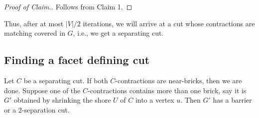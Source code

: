 \documentclass[11pt]{article}
\newcommand{\1}{\mathbf{1}}
\newcommand{\0}{\mathbf{0}}
\newcommand{\zS}{\mathcal S}
\newenvironment{cproof}
{\begin{proof}
 [Proof of Claim.]
 \vspace{-1.2\parsep}}
{\renewcommand{\qed}{\hfill $\Diamond$} \end{proof}}
\begin{document}
\begin{cproof}
    Follows from Claim 1.
\end{cproof}
Thus, after at most $|V|/2$ iterations, we will arrive at a cut whose contractions are matching covered in $G$, i.e., we get a separating cut.
\subsection{Finding a facet defining cut}\label{sub:find-fdi}
Let $C$ be a separating cut.
If both $C$-contractions are near-bricks, then we are done. Suppose one of the $C$-contractions contains more than one brick, say it is $G'$ obtained by shrinking the shore $U$ of $C$ into a vertex $u$. Then $G'$ has a barrier or a $2$-separation cut.


\end{document}
